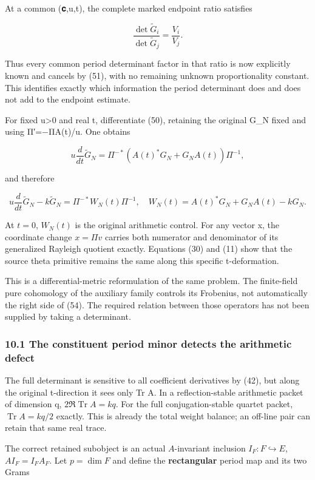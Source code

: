 At a common (𝐜,u,t), the complete marked endpoint ratio satisfies

\[
\boxed{
\frac{\det\widetilde G_i}{\det\widetilde G_j}
 =\frac{V_i}{V_j}.
}
\tag{52}
\]

Thus every common period determinant factor in that ratio is now explicitly known and cancels by (51), with no remaining unknown proportionality constant. This identifies exactly which information the period determinant does and does not add to the endpoint estimate.

For fixed u\textgreater0 and real t, differentiate (50), retaining the original G\_N fixed and using Π′=−ΠA(t)/u. One obtains

\[
u\frac{d}{dt}\widetilde G_N
 =\Pi^{-*}(A(t)^*G_N+G_NA(t))\Pi^{-1},
\tag{53}
\]

and therefore

\[
\boxed{
 u\frac{d}{dt}\widetilde G_N-k\widetilde G_N
 =\Pi^{-*}W_N(t)\Pi^{-1},
\quad W_N(t)=A(t)^*G_N+G_NA(t)-kG_N.
}
\tag{54}
\]

At \(t=0\), \(W_N(t)\) is the original arithmetic control. For any vector x, the coordinate change \(x=\Pi v\) carries both numerator and denominator of its generalized Rayleigh quotient exactly. Equations (30) and (11) show that the source theta primitive remains the same along this specific t-deformation.

This is a differential-metric reformulation of the same problem. The finite-field pure cohomology of the auxiliary family controls its Frobenius, not automatically the right side of (54). The required relation between those operators has not been supplied by taking a determinant.

\subsubsection{10.1 The constituent period minor detects the arithmetic defect}\label{endpoint-sga_trace_period--the-constituent-period-minor-detects-the-arithmetic-defect}

The full determinant is sensitive to all coefficient derivatives by (42), but along the original t-direction it sees only Tr A. In a reflection-stable arithmetic packet of dimension q, \(2\Re\operatorname{Tr}A=kq\). For the full conjugation-stable quartet packet, \(\operatorname{Tr}A=kq/2\) exactly. This is already the total weight balance; an off-line pair can retain that same real trace.

The correct retained subobject is an actual \(A\)-invariant inclusion \(I_F:F\hookrightarrow E\), \(AI_F=I_FA_F\). Let \(p=\dim F\) and define the \textbf{rectangular} period map and its two Grams

